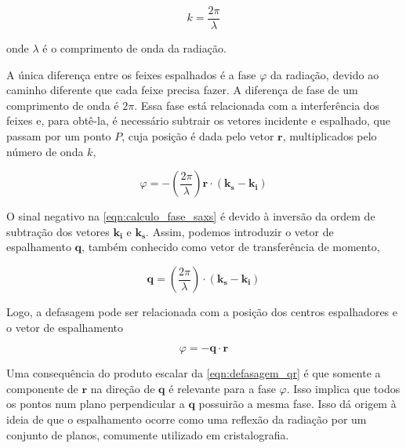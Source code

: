 		\begin{equation} 
			k = \dfrac{2 \pi}{\lambda}
			\label{eqn:numero_onda}
		\end{equation} 
		
		\noindent onde \(\lambda\) é o comprimento de onda da radiação.\cite{Glatter2018livro}
		
		A única diferença entre os feixes espalhados é a fase \(\varphi\) da radiação, devido ao caminho diferente que cada feixe precisa fazer. A diferença de fase de um comprimento de onda é \(2\pi\). Essa fase está relacionada com a interferência dos feixes e, para obtê-la, é necessário subtrair os vetores incidente e espalhado, que passam por um ponto \(P\), cuja posição é dada pelo vetor \(\mathbf{r}\), multiplicados pelo número de onda \(k\),
		
		\begin{equation}
			\varphi = - \left( \dfrac{2\pi}{\lambda} \right) \mathbf{r} \cdot \left( \mathbf{k_s} - \mathbf{k_i} \right)
			\label{eqn:calculo_fase_saxs}
		\end{equation}
		
		O sinal negativo na \autoref{eqn:calculo_fase_saxs} é devido à inversão da ordem de subtração dos vetores \(\mathbf{k_i}\) e \(\mathbf{k_s}\).\cite{Glatter2018livro} Assim, podemos introduzir o vetor de espalhamento \(\mathbf{q}\), também conhecido como vetor de transferência de momento,\cite{Glatter2018livro}
		
		\begin{equation}
			\mathbf{q} = \left( \dfrac{2\pi}{\lambda} \right) \cdot \left( \mathbf{k_s} - \mathbf{k_i} \right)
			\label{eqn:vetor_espalhamento}
		\end{equation} 
		
		Logo, a defasagem pode ser relacionada com a posição dos centros espalhadores e o vetor de espalhamento\cite{Glatter2018livro}
		
		\begin{equation}
			\varphi = - \mathbf{q} \cdot \mathbf{r}
			\label{eqn:defasagem_qr}
		\end{equation}
		
		Uma consequência do produto escalar da \autoref{eqn:defasagem_qr} é que somente a componente de \(\mathbf{r}\) na direção de \(\mathbf{q}\) é relevante para a fase \(\varphi\). Isso implica que todos os pontos num plano perpendicular a \(\mathbf{q}\) possuirão a mesma fase. Isso dá origem à ideia de que o espalhamento ocorre como uma reflexão da radiação por um conjunto de planos, comumente utilizado em cristalografia.\cite{Glatter2018livro}
		
